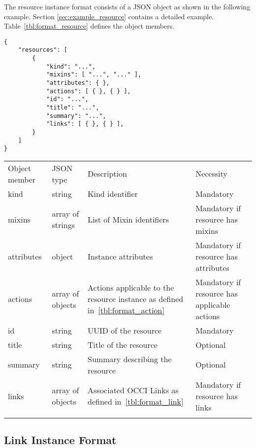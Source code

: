 \documentclass[10pt,a4paper]{article}
\begin{document}
The resource instance format consists of a JSON object as shown in the
following example. Section \ref{sec:example_resource} contains a detailed example.
Table~\ref{tbl:format_resource} defines the object members.
\begin{verbatim}
{
    "resources": [
        {
            "kind": "...",
            "mixins": [ "...", "..." ],
            "attributes": { },
            "actions": [ { }, { } ],
            "id": "...",
            "title": "...",
            "summary": "...",
            "links": [ { }, { } ],
        }
    ]
}
\end{verbatim}
 {
    \begin{tabular}{llp{5.0cm}p{3.0cm}}
    \toprule
    Object member & JSON type & Description & Necessity \\
    \colrule
    kind & string & Kind identifier & Mandatory \\

    mixins & array of strings & List of Mixin identifiers &
    Mandatory if resource has mixins \\

    attributes & object & Instance attributes & Mandatory if resource has attributes \\

    actions & array of objects & Actions applicable to the resource instance as defined in~\ref{tbl:format_action} &
    Mandatory if resource has applicable actions \\
    
    id & string & UUID of the resource & Mandatory\\
        
    title & string & Title of the resource & Optional\\
    
    summary & string & Summary describing the resource & Optional\\
    
    links & array of objects & Associated OCCI Links as defined in~\ref{tbl:format_link} &
    Mandatory if resource has links\\
    \botrule
    \end{tabular}
}
\subsection{Link Instance Format}
\label{sec:format_link}
\end{document}
